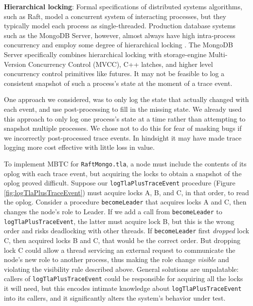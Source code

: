 \documentclass{vldb}
\begin{document}
\textbf{Hierarchical locking}: Formal specifications of distributed systems algorithms, such as Raft, model a concurrent system of interacting processes, but they typically model each process as single-threaded. 
Production database systems such as the MongoDB Server, however, almost always have high intra-process concurrency and employ some degree of hierarchical locking \cite{Gray76SharedLocks}. 
The MongoDB Server specifically combines hierarchical locking with storage-engine Multi-Version Concurrency Control (MVCC), C++ latches, and higher level concurrency control primitives like futures.
It may not be feasible to log a consistent snapshot of such a process's state at the moment of a trace event.

One approach we considered, was to only log the state that actually changed with each event, and use post-processing to fill in the missing state.
We already used this approach to only log one process's state at a time rather than attempting to snapshot multiple processes.
We chose not to do this for fear of masking bugs if we incorrectly post-processed trace events.
In hindsight it may have made trace logging more cost effective with little loss in value.


To implement MBTC for \texttt{RaftMongo.tla}, a node must include the contents of its oplog with each trace event, but acquiring the locks to obtain a snapshot of the oplog proved difficult. 
Suppose our \texttt{logTlaPlusTraceEvent} procedure (Figure \ref{fig:logTlaPlusTraceEvent}) must acquire locks A, B, and C, in that order, to read the oplog.
Consider a procedure \texttt{becomeLeader} that acquires locks A and C, then changes the node's role to Leader. 
If we add a call from \texttt{becomeLeader} to \texttt{logTlaPlusTraceEvent}, the latter must acquire lock B, but this is the wrong order and risks deadlocking with other threads.
If \texttt{becomeLeader} first \textit{dropped} lock C, then acquired locks B and C, that would be the correct order.
But dropping lock C could allow a thread servicing an external request to communicate the node's new role to another process, thus making the role change \textit{visible} and violating the visibility rule described above.
General solutions are unpalatable: callers of \texttt{logTlaPlusTraceEvent} could be responsible for acquiring all the locks it will need, but this encodes intimate knowledge about \texttt{logTlaPlusTraceEvent} into its callers, and it significantly alters the system's behavior under test.
\end{document}

